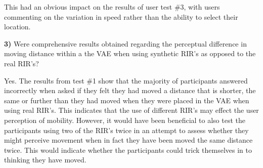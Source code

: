 \documentclass[../../main.tex]{subfiles}
\begin{document}
				 This had an obvious impact on the results of user test \#3, with users commenting on the variation in speed rather than the ability to select their location.

			\textbf{3)} Were comprehensive results obtained regarding the perceptual difference in moving distance within a the \ac{VAE} when using synthetic \ac{RIR}'s as opposed to the real \ac{RIR}'s?

				Yes. The results from test \#1 show that the majority of participants answered incorrectly when asked if they felt they had moved a distance that is shorter, the same or further than they had moved when they were placed in the \ac{VAE} when using real \ac{RIR}'s. This indicates that the use of different \ac{RIR}'s may effect the user perception of mobility. However, it would have been beneficial to also test the participants using two of the \ac{RIR}'s twice in an attempt to assess whether they might perceive movement when in fact they have been moved the same distance twice. This would indicate whether the participants could trick themselves in to thinking they have moved.%



\end{document}
